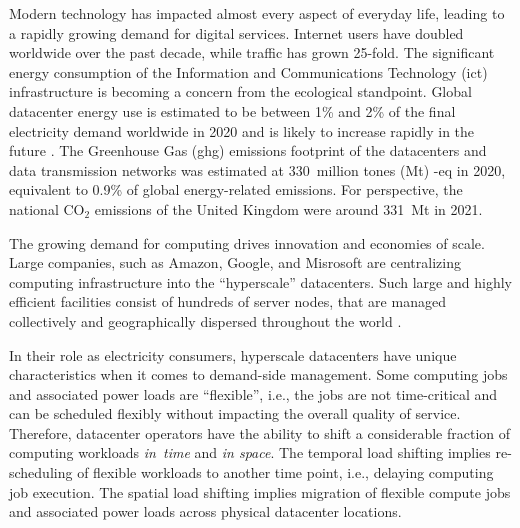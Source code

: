 %



Modern technology has impacted almost every aspect of everyday life, leading to a rapidly growing demand for digital services. Internet users have doubled worldwide over the past decade, while traffic has grown 25-fold. \cite{ieaDataCentresData2023}
The significant energy consumption of the Information and Communications Technology (\gls{ict}) infrastructure is becoming a concern from the ecological standpoint.
Global datacenter energy use is estimated to be between 1\% and 2\% of the final electricity demand worldwide in 2020 \cite{davidmyttonHowMuchEnergy2020, masanetRecalibratingGlobalData2020} and is likely to increase rapidly in the future \cite{andraeGlobalElectricityUsage2015}. 
The Greenhouse Gas (\gls{ghg}) emissions footprint of the datacenters and data transmission networks was estimated at 330~million tones (Mt) \co-eq in 2020, equivalent to 0.9\% of global energy-related emissions. \cite{ieaDataCentresData2023, malmodinICTSectorElectricity2023} 
For perspective, the national CO$_2$ emissions of the United Kingdom were around 331~Mt in 2021. \cite{UKnationalstats} 


The growing demand for computing drives innovation and economies of scale. Large companies, such as Amazon, Google, and Misrosoft are centralizing computing infrastructure into the \enquote{hyperscale} datacenters. 
Such large and highly efficient facilities consist of hundreds of server nodes, that are managed collectively and geographically dispersed throughout the world \cite{ThereAre500}. 

In their role as electricity consumers, hyperscale datacenters have unique characteristics when it comes to demand-side management. 
Some computing jobs and associated power loads are \enquote{flexible}, i.e., the jobs are not time-critical and can be scheduled flexibly without impacting the overall quality of service.
Therefore, datacenter operators have the ability to shift a considerable fraction of computing workloads \textit{in~time} and \textit{in space}. \cite{radovanovicIEEE2023} 
The temporal load shifting implies re-scheduling of flexible workloads to another time point, i.e., delaying computing job execution. 
The spatial load shifting implies migration of flexible compute jobs and associated power loads across physical datacenter locations. 

